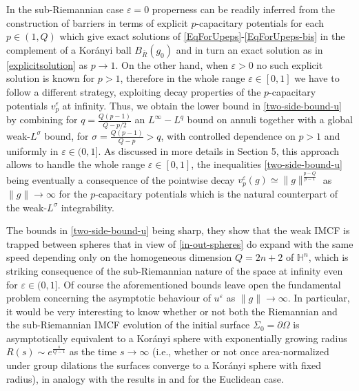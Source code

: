 \documentclass[10pt]{amsart}
\numberwithin{equation}{section}
\theoremstyle{definition}
\newcommand{\He}{\mathbb{H}}
\begin{document}
In the sub-Riemannian case $\varepsilon=0$ properness can be readily inferred from the construction of barriers in terms of explicit $p$-capacitary potentials for each $p \in (1, Q)$ which give exact solutions of \eqref{EqForUpeps}-\eqref{EqForUpeps-bis} in the complement of a Kor\'anyi ball $B_{\bar{R}}(g_0)$ and in turn an exact solution as in \eqref{explicitsolution} as $p \to 1$. 
On the other hand, when $\varepsilon >0$ no such explicit solution is known for $p >1$, therefore in the whole range $\varepsilon \in [0,1]$ we have  to follow a different strategy, exploiting decay properties of the $p$-capacitary potentials $v^\varepsilon_p$ at infinity. Thus, we obtain the lower bound in \eqref{two-side-bound-u} by combining for $q=\frac{Q(p-1)}{Q-p/2}$ an $L^\infty-L^q$ bound on annuli together with a global weak-$L^\sigma$ bound, for $\sigma=\frac{Q(p-1)}{Q-p}>q$, with controlled dependence on $p>1$ and uniformly in $\varepsilon\in (0,1]$. As discussed in more details in Section 5, this approach allows to handle the whole range $\varepsilon \in [0,1]$, the inequalities \eqref{two-side-bound-u} being eventually a consequence of the pointwise decay $ v^\varepsilon_p (g)\simeq \|g\|^{\frac{p-Q}{p-1}}$ as $\| g\| \to \infty$ for the $p$-capacitary potentials which is the natural counterpart of the weak-$L^\sigma$ integrability.

The bounds in \eqref{two-side-bound-u} being sharp, they show that the weak IMCF is trapped between spheres that in view of  \eqref{in-out-spheres} do expand with the same speed depending only on the homogeneous dimension $Q=2n+2$ of $\He^n$, which is striking consequence of the sub-Riemannian nature of the space at infinity even for $\varepsilon \in (0,1]$. Of course the aforementioned bounds leave open the fundamental problem concerning the asymptotic behaviour of $u^\varepsilon$ as $\| g \| \to \infty$. In particular, it would be very interesting to know whether or not both the Riemannian and the sub-Riemannian IMCF evolution of the initial surface $\Sigma_0=\partial \Omega$ is asymptotically equivalent to a Kor\'anyi sphere with exponentially growing radius $\displaystyle{R(s)\sim e^\frac{s}{Q-1}}$ as the time $s \to \infty$ (i.e., whether or not once area-normalized under group dilations the surfaces converge to a Kor\'anyi sphere with fixed radius), in analogy with the results in \cite{Gerhardt} and \cite{Urbas} for the Euclidean case. 
\end{document}
